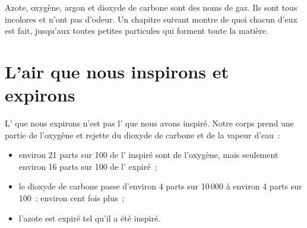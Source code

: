 \begin{remark}\label{rem:g4:air-a-mixture-of-gases:names}
Azote, oxygène, argon et dioxyde de carbone sont des noms de gaz. Ils
sont tous incolores et n'ont pas d'odeur. Un chapitre suivant montre de
quoi chacun d'eux est fait, jusqu'aux toutes petites particules qui
forment toute la matière.
\end{remark}

\section{L'air que nous inspirons et expirons}

\begin{proposition}\label{prop:g4:air-a-mixture-of-gases:breath}
L' que nous expirons n'est pas l' que nous avons inspiré. Notre
corps prend une partie de l'oxygène et rejette du dioxyde de carbone et
de la vapeur d'eau~:
\begin{itemize}
  \item environ 21 parts sur 100 de l' inspiré sont de l'oxygène,
        mais seulement environ 16 parts sur 100 de l' expiré~;
  \item le dioxyde de carbone passe d'environ 4 parts sur 10\,000 à
        environ 4 parts sur 100~: environ cent fois plus~;
  \item l'azote est expiré tel qu'il a été inspiré.
\end{itemize}
\end{proposition}

